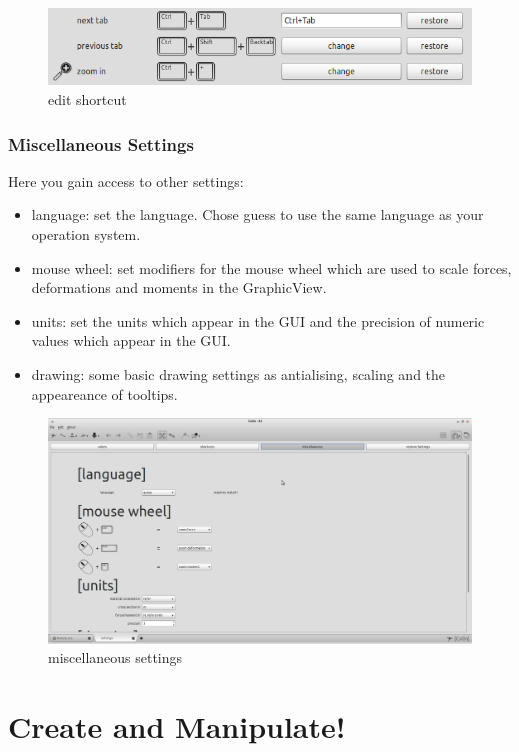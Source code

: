 \documentclass[a4paper,11pt]{report}
\begin{document}
\begin{figure}[H]
\includegraphics[width=\textwidth]{./pictures/editshortcut.png}
\caption{edit shortcut}
\label{pic:editshortcut}
\end{figure}

\subsection{Miscellaneous Settings}
\label{ssec:miscsettings}
Here you gain access to other settings:
\begin{itemize}
	\item language: set the language. Chose guess to use the same language as your operation system.
	\item mouse wheel: set modifiers for the mouse wheel which are used to scale forces, deformations and moments in the GraphicView.
	\item units: set the units which appear in the GUI and the precision of numeric values which appear in the GUI.
	\item drawing: some basic drawing settings as antialising, scaling and the appeareance of tooltips.
\end{itemize}
\begin{figure}[H]
\includegraphics[width=\textwidth]{./pictures/settings_misc.png}
\caption{miscellaneous settings}
\label{pic:miscsettings}
\end{figure}

\chapter{Create and Manipulate!}
\label{cha:create}
\end{document}
